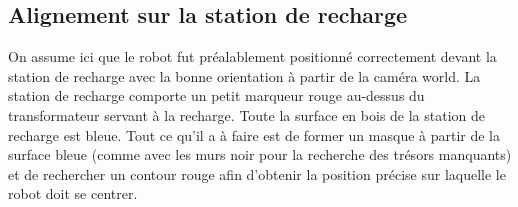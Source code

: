 \subsection{Alignement sur la station de recharge}

On assume ici que le robot fut préalablement positionné correctement devant la station de recharge avec la bonne orientation à partir de la caméra world. La station de recharge comporte un petit marqueur rouge au-dessus du transformateur servant à la recharge. Toute la surface en bois de la station de recharge est bleue. Tout ce qu'il a à faire est de former un masque à partir de la surface bleue (comme avec les murs noir pour la recherche des trésors manquants) et de rechercher un contour rouge afin d'obtenir la position précise sur laquelle le robot doit se centrer. 
